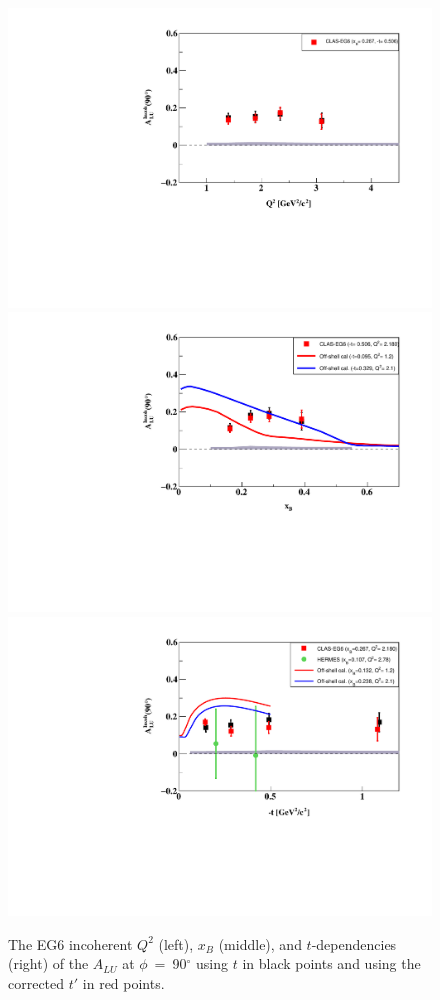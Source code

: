 \documentclass[a4paper,11pt,twoside]{article}
\begin{document}
\begin{figure}[tb]
   \centering
\includegraphics[width=12cm]{fig/ALU_90_p_vs_Q2_shortscenrario.pdf}
\includegraphics[width=12cm]{fig/ALU_90_p_vs_x_shortscenrario.pdf}
\includegraphics[width=12cm]{fig/ALU_90_p_vs_t_shortscenrario.pdf}
\caption{The EG6 incoherent $Q^{2}$ (left), $x_{B}$ (middle), and 
$t$-dependencies (right) of the $A_{LU}$ at $\phi$~=~90$^{\circ}$ using $t$ in 
black points and using the corrected $t'$ in red points. }
\label{fig:alu90}
\end{figure}
\end{document}
